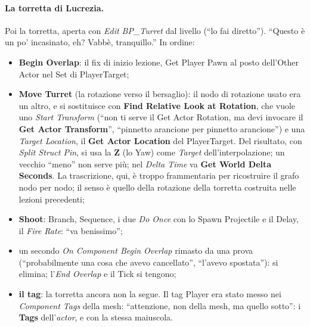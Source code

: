 \paragraph{La torretta di Lucrezia.} Poi la torretta, aperta con \emph{Edit BP\_Turret} dal
livello (``lo fai diretto''). ``Questo è un po' incasinato, eh? Vabbè, tranquillo.'' In
ordine:
\begin{itemize}
  \item \textbf{Begin Overlap}: il fix di inizio lezione, Get Player Pawn al posto
        dell'Other Actor nel Set di PlayerTarget;
  \item \textbf{Move Turret} (la rotazione verso il bersaglio): il nodo di rotazione
        usato era un altro, e si sostituisce con \textbf{Find Relative Look at
        Rotation}, che vuole uno \emph{Start Transform} (``non ti serve il Get Actor
        Rotation, ma devi invocare il \textbf{Get Actor Transform}'', ``pinnetto
        arancione per pinnetto arancione'') e una \emph{Target Location}, il \textbf{Get
        Actor Location} del PlayerTarget. Del risultato, con \emph{Split Struct Pin}, si
        usa la \textbf{Z} (lo Yaw) come \emph{Target} dell'interpolazione; un vecchio
        ``meno'' non serve più; nel \emph{Delta Time} va \textbf{Get World Delta Seconds}.
        La trascrizione, qui, è troppo frammentaria per ricostruire il grafo nodo per nodo;
        il senso è quello della rotazione della torretta costruita nelle lezioni
        precedenti;
  \item \textbf{Shoot}: Branch, Sequence, i due \emph{Do Once} con lo Spawn Projectile e il
        Delay, il \emph{Fire Rate}: ``va benissimo'';
  \item un secondo \emph{On Component Begin Overlap} rimasto da una prova (``probabilmente
        una cosa che avevo cancellato'', ``l'avevo spostata''): si elimina; l'\emph{End
        Overlap} e il Tick si tengono;
  \item \textbf{il tag}: la torretta ancora non la segue. Il tag Player era stato messo nei
        \emph{Component Tags} della mesh: ``attenzione, non della mesh, ma quello sotto'':
        i \textbf{Tags} dell'\emph{actor}, e con la stessa maiuscola.
\end{itemize}

